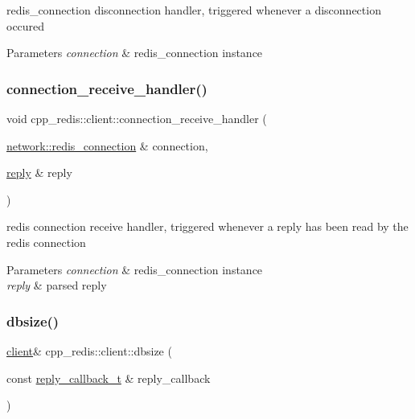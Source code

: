 redis\+\_\+connection disconnection handler, triggered whenever a disconnection occured


\begin{DoxyParams}{Parameters}
{\em connection} & redis\+\_\+connection instance \\
\hline
\end{DoxyParams}
\mbox{\label{classcpp__redis_1_1client_ac9e2229d4d20db863681447e24046aef}} 
\subsubsection{\texorpdfstring{connection\+\_\+receive\+\_\+handler()}{connection\_receive\_handler()}}
{\footnotesize\ttfamily void cpp\+\_\+redis\+::client\+::connection\+\_\+receive\+\_\+handler (\begin{DoxyParamCaption}\item[{\hyperlink{classcpp__redis_1_1network_1_1redis__connection}{network\+::redis\+\_\+connection} \&}]{connection,  }\item[{\hyperlink{classcpp__redis_1_1reply}{reply} \&}]{reply }\end{DoxyParamCaption})\hspace{0.3cm}{\ttfamily [private]}}

redis connection receive handler, triggered whenever a reply has been read by the redis connection


\begin{DoxyParams}{Parameters}
{\em connection} & redis\+\_\+connection instance \\
\hline
{\em reply} & parsed reply \\
\hline
\end{DoxyParams}
\mbox{\label{classcpp__redis_1_1client_a87a8351f0a6927db52b4ab2a5b9192c9}} 
\subsubsection{\texorpdfstring{dbsize()}{dbsize()}\hspace{0.1cm}{\footnotesize\ttfamily [1/2]}}
{\footnotesize\ttfamily \hyperlink{classcpp__redis_1_1client}{client}\& cpp\+\_\+redis\+::client\+::dbsize (\begin{DoxyParamCaption}\item[{const \hyperlink{classcpp__redis_1_1client_a061a1140d36d2eaeda82b09a0bb3f9f2}{reply\+\_\+callback\+\_\+t} \&}]{reply\+\_\+callback }\end{DoxyParamCaption})}

